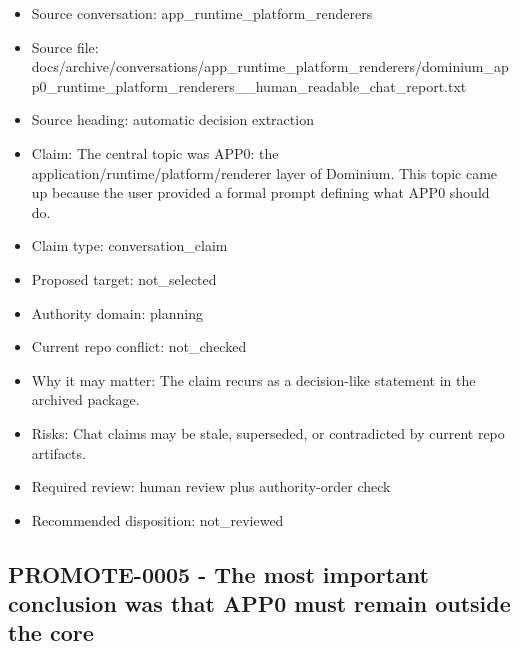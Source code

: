 \documentclass[11pt,a4paper]{report}
\begin{document}
\begin{itemize}
\item Source conversation: app\_runtime\_platform\_renderers
\item Source file: docs/archive/conversations/app\_runtime\_platform\_renderers/dominium\_app0\_runtime\_platform\_renderers\_\_human\_readable\_chat\_report.txt
\item Source heading: automatic decision extraction
\item Claim: The central topic was APP0: the application/runtime/platform/renderer layer of Dominium. This topic came up because the user provided a formal prompt defining what APP0 should do.
\item Claim type: conversation\_claim
\item Proposed target: not\_selected
\item Authority domain: planning
\item Current repo conflict: not\_checked
\item Why it may matter: The claim recurs as a decision-like statement in the archived package.
\item Risks: Chat claims may be stale, superseded, or contradicted by current repo artifacts.
\item Required review: human review plus authority-order check
\item Recommended disposition: not\_reviewed
\end{itemize}

\subsection{PROMOTE-0005 - The most important conclusion was that APP0 must remain outside the core}
\end{document}
